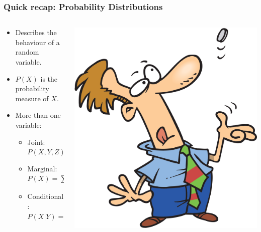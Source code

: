 \documentclass[12pt]{beamer} %
\begin{document}
\begin{frame}
\frametitle{Quick recap: Probability Distributions}
\begin{columns}
    \begin{column}{0.6\textwidth}
\begin{itemize}
\item Describes the behaviour of a random variable.
\item $P(X)$ is the probability measure of $X$.
\item More than one variable:
\begin{itemize}
\item Joint: $P(X, Y, Z)$
\item Marginal: $P(X) = \sum_Y P(X,Y)$
\item Conditional: $P(X|Y) = \frac{P(X,Y)}{P(Y)}$
\end{itemize}
\end{itemize}
    \end{column}
    \begin{column}{0.4\textwidth}
\begin{center}
\includegraphics[width=\columnwidth]{figures/uncert_fig_tossingcoin.png}
\end{center}
    \end{column}
\end{columns}
\end{frame}
\end{document}
